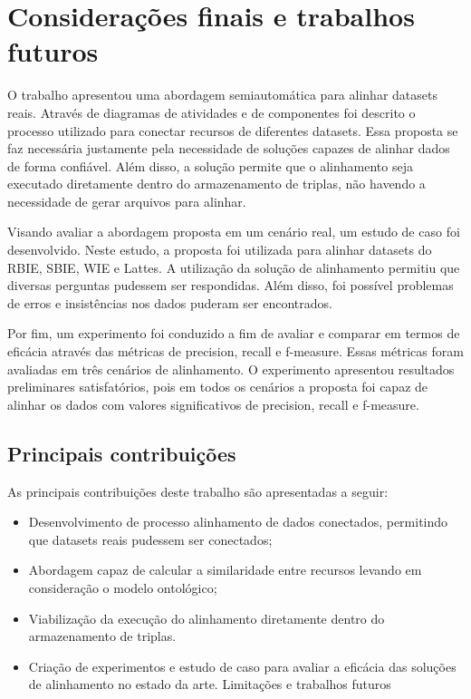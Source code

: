 \chapter{Considerações finais e trabalhos futuros}

O trabalho apresentou uma abordagem semiautomática para alinhar datasets reais. Através de diagramas de atividades e de componentes foi descrito o processo utilizado para conectar recursos de diferentes datasets. Essa proposta se faz necessária justamente pela necessidade de soluções capazes de alinhar dados de forma confiável. Além disso, a solução permite que o alinhamento seja executado diretamente dentro do armazenamento de triplas, não havendo a necessidade de gerar arquivos para alinhar. 

Visando avaliar a abordagem proposta em um cenário real, um estudo de caso foi desenvolvido. Neste estudo, a proposta foi utilizada para alinhar datasets do RBIE, SBIE, WIE e Lattes. A utilização da solução de alinhamento permitiu que diversas perguntas pudessem ser respondidas. Além disso, foi possível problemas de erros e insistências nos dados puderam ser encontrados.

Por fim, um experimento foi conduzido  a fim de avaliar e comparar em termos de eficácia através das métricas de precision, recall e f-measure. Essas métricas foram avaliadas em três cenários de alinhamento. O experimento apresentou resultados preliminares satisfatórios, pois em todos os cenários a proposta foi capaz de alinhar os dados com valores significativos de precision, recall e f-measure.

\section{Principais contribuições}
As principais contribuições deste trabalho são apresentadas a seguir:
\begin{itemize}
\item Desenvolvimento de processo alinhamento de dados conectados, permitindo que datasets reais pudessem ser conectados;
\item Abordagem capaz de calcular a similaridade entre recursos levando em consideração o modelo ontológico;
\item Viabilização da execução do alinhamento diretamente dentro do armazenamento de triplas.
\item  Criação de experimentos e estudo de caso para avaliar a eficácia das soluções de alinhamento no estado da arte.
Limitações e trabalhos futuros
\end{itemize}

